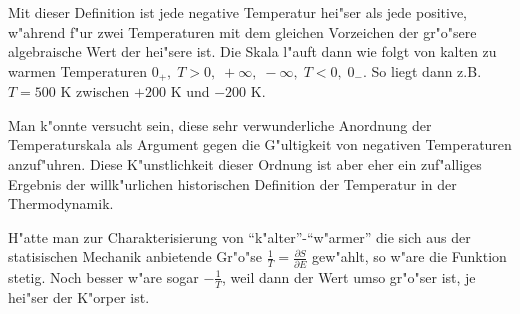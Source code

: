 \documentclass[12pt]{article}
\begin{document}
\begin{module}[id=mytemparature,uses=probability-intro]
Mit dieser Definition ist jede negative Temperatur hei"ser als jede positive,
w"ahrend f"ur zwei Temperaturen mit dem gleichen Vorzeichen der gr"o"sere
algebraische Wert der hei"sere ist.
Die Skala l"auft dann wie folgt von kalten zu warmen Temperaturen
$0_+ ,\; T>0 ,\; +\infty ,\; -\infty , \; T<0 , \; 0_-$.
So liegt dann z.B. $T=500$ K zwischen $+200$ K und $-200$ K.

Man k"onnte versucht sein, diese sehr verwunderliche Anordnung der 
Temperaturskala als Argument gegen die G"ultigkeit von negativen Temperaturen 
anzuf"uhren. Diese K"unstlichkeit dieser Ordnung ist aber eher ein zuf"alliges
Ergebnis der willk"urlichen historischen Definition der Temperatur in
der Thermodynamik.

H"atte man zur Charakterisierung von ``k"alter''-``w"armer'' die
sich aus der statisischen Mechanik anbietende Gr"o"se
$\frac{1}{T} = \frac{\partial S}{\partial E}$ gew"ahlt, so w"are die
Funktion stetig. Noch besser w"are sogar $-\frac{1}{T}$, weil dann der Wert
umso gr"o"ser ist, je hei"ser der K"orper ist.



\end{module}
\end{document}
